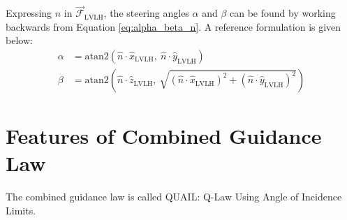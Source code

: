Expressing $\hat{n}$ in $\vec{\mathcal{F}}_{\text{LVLH}}$, the steering angles $\alpha$ and $\beta$ can be found by working backwards from Equation \ref{eq:alpha_beta_n}. A reference formulation is given below:
\begin{align*}
    \alpha & = \mathrm{atan2}\left(\hat{n} \cdot \hat{x}_{\text{LVLH}}, \ \hat{n} \cdot \hat{y}_{\text{LVLH}}\right)                                                      \\
    \beta  & = \mathrm{atan2}\left(\hat{n} \cdot \hat{z}_{\text{LVLH}}, \ \sqrt{(\hat{n} \cdot \hat{x}_{\text{LVLH}})^2 + (\hat{n} \cdot \hat{y}_{\text{LVLH}})^2}\right)
\end{align*}

\section{Features of Combined Guidance Law}
The combined guidance law is called QUAIL: Q-Law Using Angle of Incidence Limits.


